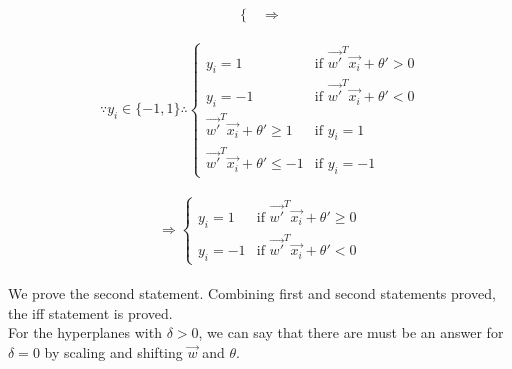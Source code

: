 \begin{enumerate}
\begin{itemize}
\begin{equation*}
\begin{cases}
		\end{cases}
		\Rightarrow
\end{equation*}\\
\begin{equation*}
 	\because y_i \in \{-1,1\} \therefore 
	\begin{cases}
			y_i = 1 & \mbox{if } \vec{w'}^T \vec{x_i} + \theta' > 0 \\
			y_i = -1 & \mbox{if } \vec{w'}^T \vec{x_i} + \theta' < 0 \\
			\vec{w'}^T \vec{x_i} + \theta' \geq 1 & \mbox{if } y_i =1 \\
			\vec{w'}^T \vec{x_i} + \theta' \leq -1 & \mbox{if } y_i =-1 
	\end{cases}
	\end{equation*}\\
\begin{equation*}
\Rightarrow
	\begin{cases}
		y_i = 1 & \mbox{if } \vec{w'}^T \vec{x_i} + \theta' \geq 0 \\
		y_i = -1 & \mbox{if } \vec{w'}^T \vec{x_i} + \theta' < 0
	\end{cases}
\end{equation*}
\\
 We prove the second statement. Combining first and second statements proved, the iff statement is proved.
\\
For the hyperplanes with $\delta > 0$, we can say that there are must be an answer for $\delta = 0$ by scaling and shifting $\vec{w}$ and $\theta$.


\end{itemize}
\end{enumerate}
